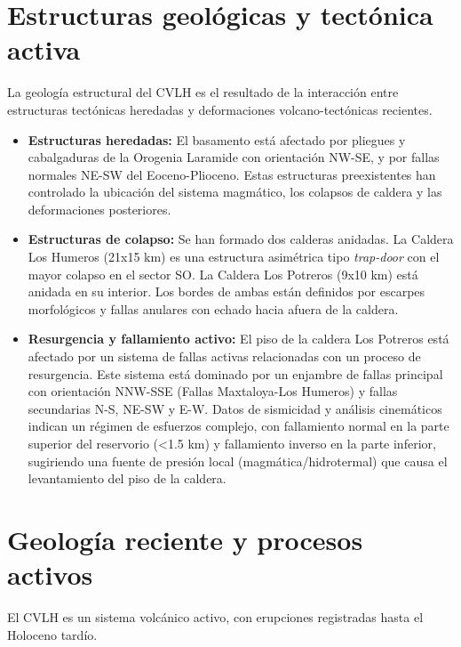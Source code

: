 \section{Estructuras geológicas y tectónica activa}
La geología estructural del CVLH es el resultado de la interacción entre estructuras tectónicas heredadas y deformaciones volcano-tectónicas recientes.

\begin{itemize}
    \item \textbf{Estructuras heredadas:} El basamento está afectado por pliegues y cabalgaduras de la Orogenia Laramide con orientación NW-SE, y por fallas normales NE-SW del Eoceno-Plioceno. Estas estructuras preexistentes han controlado la ubicación del sistema magmático, los colapsos de caldera y las deformaciones posteriores.
    \item \textbf{Estructuras de colapso:} Se han formado dos calderas anidadas. La Caldera Los Humeros (21x15 km) es una estructura asimétrica tipo \textit{trap-door} con el mayor colapso en el sector SO. La Caldera Los Potreros (9x10 km) está anidada en su interior. Los bordes de ambas están definidos por escarpes morfológicos y fallas anulares con echado hacia afuera de la caldera.
    \item \textbf{Resurgencia y fallamiento activo:} El piso de la caldera Los Potreros está afectado por un sistema de fallas activas relacionadas con un proceso de resurgencia. Este sistema está dominado por un enjambre de fallas principal con orientación NNW-SSE (Fallas Maxtaloya-Los Humeros) y fallas secundarias N-S, NE-SW y E-W. Datos de sismicidad y análisis cinemáticos indican un régimen de esfuerzos complejo, con fallamiento normal en la parte superior del reservorio (<1.5 km) y fallamiento inverso en la parte inferior, sugiriendo una fuente de presión local (magmática/hidrotermal) que causa el levantamiento del piso de la caldera.
\end{itemize}

\section{Geología reciente y procesos activos}
El CVLH es un sistema volcánico activo, con erupciones registradas hasta el Holoceno tardío.

